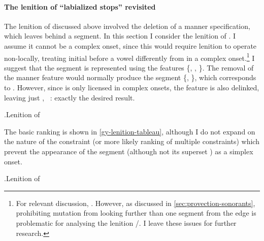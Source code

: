 \paragraph{The lenition of \enquote{labialized stops} revisited}
\label{sec:lenit-enqu-stops}

The lenition of \ipa{[ɡw]} discussed above involved the deletion of a manner specification, which leaves behind a  segment. In this section I consider the lenition of \ipa{[dʒɥ]}. I assume it cannot be a complex onset, since this would require lenition to operate non-locally, treating initial \ipa{[dʒ]} before a vowel differently from \ipa{[dʒ]} in a complex onset.\footnote{For relevant discussion, \cf \citet{buckley09:_local}. However, as discussed in \cref{sec:provection-sonorants}, prohibiting mutation from looking further than one segment from the edge is problematic for analysing the lenition \ipa{[r̥]}/\ipa{[hr]}. I leave these issues for further research.} I suggest that the segment \ipa{[dʒɥ]} is represented using the features \{, , \}. The removal of the manner feature would normally produce the segment \{, \}, which corresponds to \ipa{[ɥ]}. However, since \ipa{[ɥ]} is only licensed in complex onsets, the  feature is also delinked, leaving just , \ie\ \ipa{[v]}: exactly the desired result.


\ex.\label{ex:gy-lenition}Lenition of \ipa{[dʒɥ]}\\

The basic ranking is shown in \cref{gy-lenition-tableau}, although I do not expand on the nature of the constraint (or more likely ranking of multiple constraints) which prevent the appearance of the segment \ipa{[ɥ]} (although not its superset \ipa{[dʒɥ]}) as a simplex onset.

\ex.\label{gy-lenition-tableau}Lenition of \ipa{[dʒɥ]}\\
\begin{OTtableau}{5}
\end{OTtableau}



